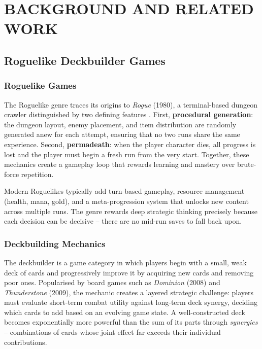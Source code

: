 \clearpage
{}
\chapter{BACKGROUND AND RELATED WORK}

\section{Roguelike Deckbuilder Games}

\subsection{Roguelike Games}

The Roguelike genre traces its origins to \textit{Rogue} (1980), a terminal-based dungeon crawler distinguished by two defining features \cite{dormans2011level}. First, \textbf{procedural generation}: the dungeon layout, enemy placement, and item distribution are randomly generated anew for each attempt, ensuring that no two runs share the same experience. Second, \textbf{permadeath}: when the player character dies, all progress is lost and the player must begin a fresh run from the very start. Together, these mechanics create a gameplay loop that rewards learning and mastery over brute-force repetition.

Modern Roguelikes typically add turn-based gameplay, resource management (health, mana, gold), and a meta-progression system that unlocks new content across multiple runs. The genre rewards deep strategic thinking precisely because each decision can be decisive -- there are no mid-run saves to fall back upon.

\subsection{Deckbuilding Mechanics}

The deckbuilder is a game category in which players begin with a small, weak deck of cards and progressively improve it by acquiring new cards and removing poor ones. Popularised by board games such as \textit{Dominion} (2008) and \textit{Thunderstone} (2009), the mechanic creates a layered strategic challenge: players must evaluate short-term combat utility against long-term deck synergy, deciding which cards to add based on an evolving game state. A well-constructed deck becomes exponentially more powerful than the sum of its parts through \textit{synergies} -- combinations of cards whose joint effect far exceeds their individual contributions.

